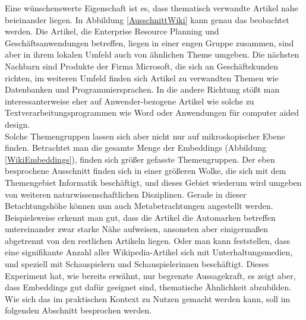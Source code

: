 Eine wünschenswerte Eigenschaft ist es, dass thematisch verwandte Artikel nahe beieinander liegen. In Abbildung \ref{AusschnittWiki} kann genau das beobachtet werden. Die Artikel, die Enterprise Resource Planning und Geschäftsanwendungen betreffen, liegen in einer engen Gruppe zusammen, sind aber in ihrem lokalen Umfeld auch von ähnlichen Theme umgeben. Die nächsten Nachbarn sind Produkte der Firma Microsoft, die sich an Geschäftskunden richten, im weiteren Umfeld finden sich Artikel zu verwandten Themen wie Datenbanken und Programmiersprachen. In die andere Richtung stößt man interessanterweise eher auf Anwender-bezogene Artikel wie solche zu Textverarbeitungsprogrammen wie Word oder Anwendungen für computer aided design. \\

Solche Themengruppen lassen sich aber nicht nur auf mikroskopischer Ebene finden. Betrachtet man die gesamte Menge der Embeddings (Abbildung \ref{WikiEmbeddings}), finden sich größer gefasste Themengruppen. Der eben besprochene Ausschnitt finden sich in einer größeren Wolke, die sich mit dem Themengebiet Informatik beschäftigt, und dieses Gebiet wiederum wird umgeben von weiteren naturwissenschaftlichen Disziplinen. Gerade in dieser Betachtungshöhe können nun auch Metabetrachtungen angestellt werden. Beispielsweise erkennt man gut, dass die Artikel die Automarken betreffen untereinander zwar starke Nähe aufweisen, ansonsten aber einigermaßen abgetrennt von den restlichen Artikeln liegen. Oder man kann feststellen, dass eine signifikante Anzahl aller Wikipedia-Artikel sich mit Unterhaltungsmedien, und speziell mit Schauspielern und Schauspielerinnen beschäftigt. Dieses Experiment hat, wie bereits erwähnt, nur begrenzte Aussagekraft, es zeigt aber, dass Embeddings gut dafür geeignet sind, thematische Ähnlichkeit abzubilden. Wie sich das im praktischen Kontext zu Nutzen gemacht werden kann, soll im folgenden Abschnitt besprochen werden.

